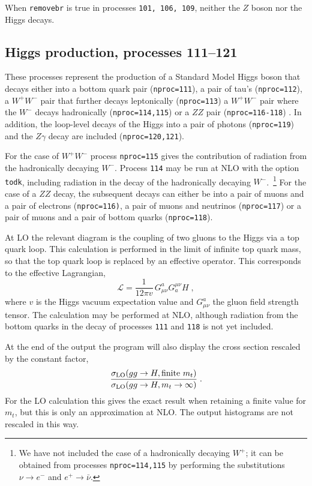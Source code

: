 \documentclass{article}
\begin{document}
When {\tt removebr} is true in processes {\tt 101, 106, 109}, neither the $Z$ boson
nor the Higgs decays.

\subsection{Higgs production, processes 111--121}
\label{subsec:h}

These processes represent the production of a Standard Model Higgs
boson that decays either into a bottom quark
pair ({\tt nproc=111}), a pair of tau's ({\tt nproc=112}), 
a $W^+W^-$ 
pair that further decays leptonically ({\tt nproc=113}) 
a $W^+W^-$ pair where the $W^-$ decays hadronically ({\tt nproc=114,115}) 
or a $ZZ$ pair ({\tt nproc=116-118}) . In addition, the loop-level decays of the Higgs 
into a pair of photons ({\tt nproc=119}) and the $Z\gamma$ decay are included
({\tt nproc=120,121}).

For the case of $W^+W^-$ process {\tt nproc=115} gives the contribution 
of radiation from the hadronically decaying $W^-$.
Process {\tt 114} may be run at NLO with the option {\tt todk},
including radiation in the decay of the hadronically decaying $W^-$.~\footnote{
We have not included the case of a hadronically decaying $W^+$; it can
be obtained from processes {\tt nproc=114,115} by performing the
substitutions $\nu \to e^-$ and $e^+ \to \bar{\nu}$.}
For the case of a $ZZ$ decay,
the subsequent decays can either be into a pair of muons and a pair of electrons
({\tt nproc=116)}, a pair of muons and neutrinos ({\tt nproc=117}) or
a pair of muons and a pair of bottom quarks ({\tt nproc=118}).

At LO the relevant diagram
is the coupling of two gluons to the Higgs via a top quark loop.
This calculation is performed in the limit of infinite top quark mass, so that 
the top quark loop is replaced by an effective operator. This corresponds
to the effective Lagrangian,
\begin{equation}
\mathcal{L} = \frac{1}{12\pi v} \, G^a_{\mu\nu} G^{\mu\nu}_a H \;,
\label{eq:HeffL}
\end{equation}
where $v$ is the Higgs vacuum expectation value and $G^a_{\mu\nu}$ the
gluon field strength tensor.
The calculation may be performed at NLO, although radiation from the
bottom quarks in the decay of processes {\tt 111} and {\tt 118} is not yet included.

At the end of the output the program will also display the cross section rescaled
by the constant factor,
\begin{equation}
\frac{\sigma_{\rm LO}(gg \to H, \mbox{finite}~m_t)}{\sigma_{\rm LO}(gg \to H, m_t \to \infty)} \;.
\label{eqn:hrescale}
\end{equation}
For the LO calculation this gives the exact result when retaining a finite value for $m_t$,
but this is only an approximation at NLO. The output histograms are not rescaled in this way.
\end{document}
